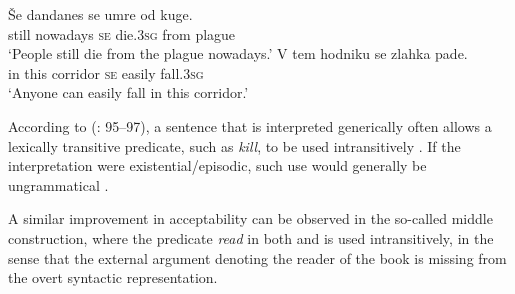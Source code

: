\documentclass[output=paper,
modfonts,nonflat,
newtxmath
]{langsci/langscibook}
\begin{document}
\begin{exe}
\ex \label{ex:lenardic: 31} \begin{xlist}
 \label{ex:lenardic: 31a}
 \label{ex:lenardic: 31b}
\end{xlist}
\ex \label{ex:lenardic: 32} \begin{xlist}
\ex \label{ex:lenardic: 32a}\gll Še dandanes se umre od kuge.\\
still nowadays \textsc{se} die.\textsc{3sg} from plague\\
\trans `People still die from the plague nowadays.'
\ex \label{ex:lenardic: 32b} \gll V tem hodniku se zlahka pade.\\
in this corridor \textsc{se} easily fall.\textsc{3sg}\\
\trans `Anyone can easily fall in this corridor.'
\end{xlist}
\end{exe} \par

\noindent According to \citeauthor{hartl2012} (\citeyear{hartl2012}: 95--97), a sentence that is interpreted generically often allows a lexically transitive predicate, such as \textit{kill}, to be used intransitively . If the interpretation were existential/episodic, such use would generally be ungrammatical .
\largerpage[2]

\begin{exe}
\ex \label{ex:lenardic: 33}
\begin{xlist}
\label{ex:lenardic: 33a}
 \label{ex:lenardic: 33b}
\end{xlist}
\end{exe} \par

\noindent A similar improvement in acceptability can be observed in the so-called middle construction, where the predicate \textit{read} in both  and  is used intransitively, in the sense that the external argument denoting the reader of the book is missing from the overt syntactic representation.
\end{document}
